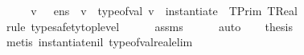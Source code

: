 \begin{isabellebody}
%
\isadelimproof
%
\endisadelimproof
%
\isatagproof
{}\isamarkupfalse%
\ {\isacharminus}{\kern0pt}\isanewline
\ \ \isamarkupfalse%
\ {\isachardoublequoteopen}{\isasymexists}v{\isachardot}{\kern0pt}\ {\isacharparenleft}{\kern0pt}{\isasymLambda}{\isacharcomma}{\kern0pt}{\isasymGamma}{\isacharcomma}{\kern0pt}{\isacharbrackleft}{\kern0pt}{\isacharbrackright}{\kern0pt}\ {\isasymturnstile}\ {\isasymlangle}e{\isacharcomma}{\kern0pt}n{\isacharunderscore}{\kern0pt}s{\isasymrangle}\ {\isasymDown}\ v{\isacharparenright}{\kern0pt}\ {\isasymand}\ type{\isacharunderscore}{\kern0pt}of{\isacharunderscore}{\kern0pt}val\ v\ {\isacharequal}{\kern0pt}\ instantiate\ {\isacharbrackleft}{\kern0pt}{\isacharbrackright}{\kern0pt}\ {\isacharparenleft}{\kern0pt}TPrim\ TReal{\isacharparenright}{\kern0pt}{\isachardoublequoteclose}\isanewline
\ \ \ \ \isamarkupfalse%
\ {\isacharparenleft}{\kern0pt}rule\ type{\isacharunderscore}{\kern0pt}safety{\isacharunderscore}{\kern0pt}top{\isacharunderscore}{\kern0pt}level{\isacharparenright}{\kern0pt}\isanewline
\ \ \ \ \isamarkupfalse%
\ assms\isanewline
\ \ \ \ \isamarkupfalse%
\ auto\isanewline
\ \ \isamarkupfalse%
\ {\isacharquery}{\kern0pt}thesis\isanewline
\ \ \ \ \isamarkupfalse%
\ {\isacharparenleft}{\kern0pt}metis\ instantiate{\isacharunderscore}{\kern0pt}nil\ type{\isacharunderscore}{\kern0pt}of{\isacharunderscore}{\kern0pt}val{\isacharunderscore}{\kern0pt}real{\isacharunderscore}{\kern0pt}elim{\isacharparenright}{\kern0pt}\isanewline
{}\isamarkupfalse%
%
\endisatagproof
{\isafoldproof}%
%
\isadelimproof
\isanewline
%
\endisadelimproof
\isanewline
{}\isamarkupfalse%
\isanewline
%
\isadelimtheory
\isanewline
%
\endisadelimtheory
%
\isatagtheory
{}\isamarkupfalse%
%
\endisatagtheory
{\isafoldtheory}%
%
\isadelimtheory
%
\endisadelimtheory
%
\end{isabellebody}%
\endinput

